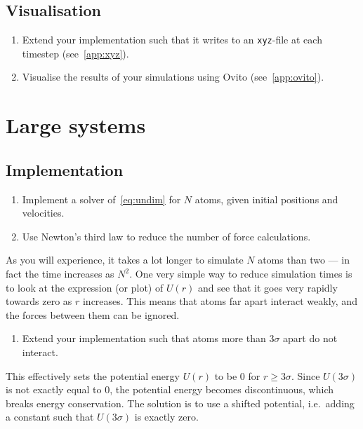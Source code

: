 \documentclass[11pt,british,a4paper]{report}
\begin{document}
\subsection{Visualisation}
\begin{enumerate}[label=\roman*.]
    \item Extend your implementation such that it writes to an \texttt{xyz}-file at each timestep (see~\vref{app:xyz}).
    \item Visualise the results of your simulations using Ovito (see~\vref{app:ovito}).
\end{enumerate}

\section{Large systems}

\subsection{Implementation}
\begin{enumerate}[label=\roman*.]
    \item Implement a solver of~\vref{eq:undim} for \(N\) atoms, given initial positions and velocities.
    \item Use Newton's third law to reduce the number of force calculations.
\end{enumerate}

As you will experience, it takes a lot longer to simulate \(N\) atoms than two --- in fact the time increases as \(N^2\). One very simple way to reduce simulation times is to look at the expression (or plot) of \(U(r)\) and see that it goes very rapidly towards zero as \(r\) increases. This means that atoms far apart interact weakly, and the forces between them can be ignored.

\begin{enumerate}[label=\roman*., resume]
    \item Extend your implementation such that atoms more than \(3\sigma\) apart do not interact.
\end{enumerate}

This effectively sets the potential energy \(U(r)\) to be \(0\) for \(r\geq 3\sigma\). Since \(U(3\sigma)\) is not exactly equal to \(0\), the potential energy becomes discontinuous, which breaks energy conservation. The solution is to use a shifted potential, i.e.\ adding a constant such that \(U(3\sigma)\) is exactly zero.
\end{document}
